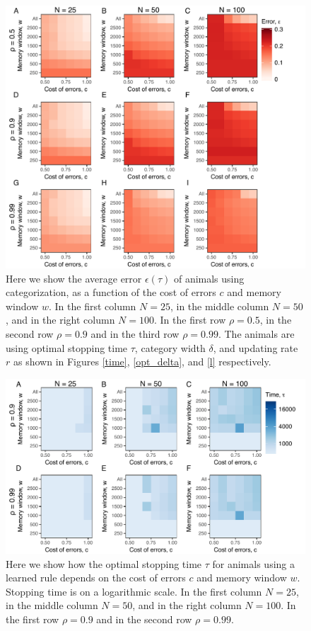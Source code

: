 \begin{figure}
\includegraphics[width=6.85in]{figures/error_heat_maps.pdf}
\caption{\sffamily\small\textbf{} Here we show the average error $\epsilon(\tau)$ of animals using categorization, as a function of the cost of errors $c$ and memory window $w$. In the first column $N=25$, in the middle column $N=50$, and in the right column $N=100$. In the first  row $\rho=0.5$, in the second row $\rho=0.9$ and in the third row $\rho=0.99$. The animals are using optimal stopping time $\tau$, category width $\delta$, and updating rate $r$  as shown in Figures \ref{time}, \ref{opt_delta}, and \ref{l} respectively. }
\label{error}
\end{figure}


\begin{figure}
\includegraphics[width=6.85in]{figures/time_heat_maps_rule.pdf}
\caption{\sffamily\small\textbf{} Here we show how the optimal stopping time $\tau$ for animals using a learned rule depends on the cost of errors $c$ and memory window $w$. Stopping time is on a logarithmic scale. In the first column $N=25$, in the middle column $N=50$, and in the right column $N=100$. In the first row $\rho=0.9$ and in the second row $\rho=0.99$. }
\label{time_rule}
\end{figure}

